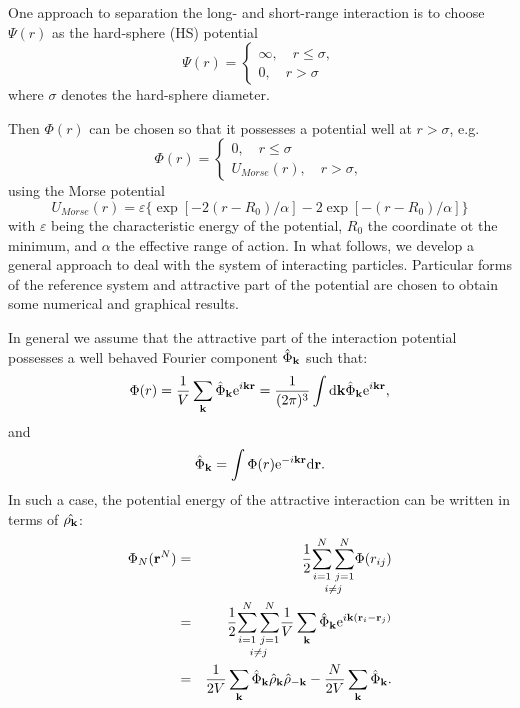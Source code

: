 One approach to separation the long- and short-range interaction is to choose $\Psi(r)$ as the hard-sphere (HS) potential
\begin{equation}
	\Psi(r) = 
	\left\{
	\begin{array}{cc}
		\infty, \quad r\leq \sigma, \\
		0, \quad r > \sigma
	\end{array}
	\right.
\end{equation}
where $\sigma$ denotes the hard-sphere diameter.

Then $\Phi(r)$ can be chosen so that it possesses a potential well at $r > \sigma$, e.g.
\begin{equation}
	\label{short-range-potential}
	\Phi(r) = \left\{
	\begin{array}{cc}
		0, \quad r \leq \sigma \\
		U_{Morse}(r), \quad r > \sigma,
	\end{array}
	\right.
\end{equation}
using the Morse potential
\begin{equation}
	U_{Morse}(r) = \varepsilon \{\exp{[-2(r-R_0)/\alpha]}-2\exp{[-(r-R_0)/\alpha]}\}
\end{equation}
with $\varepsilon$ being the characteristic energy of the potential, $R_0$ the coordinate ot the minimum, and $\alpha$ the effective range of action.
In what follows, we develop a general approach to deal with the system of interacting particles. Particular forms of the reference system and attractive part of the potential are chosen to obtain some numerical and graphical results.

In general we assume that the attractive part of the interaction potential possesses a well behaved Fourier component $\hat{\Phi}_{\vb k}$ such that:
\begin{equation}
	\Phi(r) = \frac{1}{V} \sum_{\vb k} \hat{\Phi}_{\vb k} {\rm e}^{i\vb k \vb r} = \frac{1}{(2\pi)^3} \int {\rm d} {\vb k} \hat{\Phi}_{\vb k} {\rm e}^{i\vb k \vb r},
\end{equation}
and
\begin{equation}
	\hat{\Phi}_{\vb k} = \int \Phi(r) {\rm e}^{-i\vb k \vb r} {\rm d} {\vb r}.
\end{equation}
In such a case, the potential energy of the attractive interaction can be written in terms of $\hat{\rho_{\vb k}}$:
\begin{eqnarray}
	\Phi_N(\vb r^N) &=& \frac12 \underset{i\neq j}{\sum_{i=1}^N \sum_{j=1}^N} \Phi(r_{ij})
	\nonumber\\
	&=& \frac12 \underset{i\neq j}{\sum_{i=1}^N \sum_{j=1}^N} \frac{1}{V} \sum_{\vb k} \hat{\Phi}_{\vb k} {\rm e}^{i\vb k (\vb r_i - \vb r_j)}
	\nonumber\\
	&=& \frac{1}{2V} \sum_{\vb k} \hat{\Phi}_{\vb k} \hat{\rho}_{\vb k} \hat{\rho}_{-\vb k} - \frac{N}{2V}\sum_{\vb k} \hat{\Phi}_{\vb k}.
\end{eqnarray}

